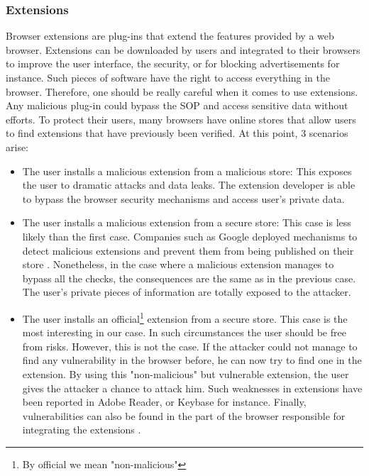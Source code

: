 \documentclass[journal]{IEEEtran}
\begin{document}
\subsubsection*{\textbf{Extensions}}
Browser extensions are plug-ins that extend the features provided by a web browser. Extensions can be downloaded by users and integrated to their browsers to improve the user interface, the security, or for blocking advertisements for instance. Such pieces of software have the right to access everything in the browser. Therefore, one should be really careful when it comes to use extensions. Any malicious plug-in could bypass the SOP and access sensitive data without efforts. To protect their users, many browsers have online stores that allow users to find extensions that have previously been verified. At this point, 3 scenarios arise:
\begin{itemize}
\item The user installs a malicious extension from a malicious store: This exposes the user to dramatic attacks and data leaks. The extension developer is able to bypass the browser security mechanisms and access user's private data.
\item The user installs a malicious extension from a secure store: This case is less likely than the first case. Companies such as Google deployed mechanisms to detect malicious extensions and prevent them from being published on their store \cite{extensionsGoogle}. Nonetheless, in the case where a malicious extension manages to bypass all the checks, the consequences are the same as in the previous case. The user's private pieces of information are totally exposed to the attacker.
\item The user installs an official\footnote{By official we mean "non-malicious"} extension from a secure store. This case is the most interesting in our case. In such circumstances the user should be free from risks. However, this is not the case. If the attacker could not manage to find any vulnerability in the browser before, he can now try to find one in the extension. By using this "non-malicious" but vulnerable extension, the user gives the attacker a chance to attack him. Such weaknesses in extensions have been reported in Adobe Reader\cite{adobeExtensionUXSS}, or Keybase \cite{uxssKeybase} for instance. 
Finally, vulnerabilities can also be found in the part of the browser responsible for integrating the extensions \cite{CVE-2015-7187} \cite{CVE-2017-5020}.

\end{itemize}
\end{document}
